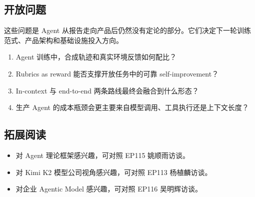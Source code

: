 \subsection{开放问题}

这些问题是 Agent 从报告走向产品后仍然没有定论的部分。它们决定下一轮训练范式、产品架构和基础设施投入方向。

\begin{enumerate}
\item Agent 训练中，合成轨迹和真实环境反馈如何配比？
\item Rubrics as reward 能否支撑开放任务中的可靠 self-improvement？
\item In-context 与 end-to-end 两条路线最终会融合到什么形态？
\item 生产 Agent 的成本瓶颈会更主要来自模型调用、工具执行还是上下文长度？
\end{enumerate}

\subsection{拓展阅读}

\begin{itemize}
\item 对 Agent 理论框架感兴趣，可对照 EP115 姚顺雨访谈。
\item 对 Kimi K2 模型公司视角感兴趣，可对照 EP113 杨植麟访谈。
\item 对企业 Agentic Model 感兴趣，可对照 EP116 吴明辉访谈。
\end{itemize}


